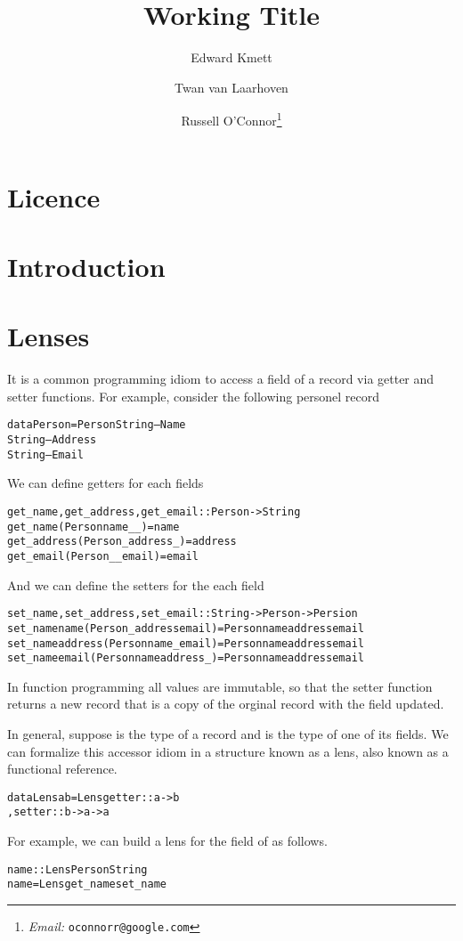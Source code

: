\documentclass{article}
\newcommand{\email}[1]{{\textit{Email:} \texttt{#1}}}
\newcommand{\tmtexttt}[1]{{\ttfamily{#1}}}
\begin{document}
\title{Working Title}\author{Edward Kmett\and Twan van Laarhoven\and Russell
O'Connor\thanks{\email{oconnorr@google.com}}}\maketitle

\section{Licence}

\section{Introduction}

\section{Lenses}

It is a common programming idiom to access a field of a record via getter and
setter functions. For example, consider the following personel record
\begin{alltt}
data Person = Person String -- Name
                     String -- Address
                     String -- Email
\end{alltt}


We can define getters for each fields
\begin{alltt}
get_name, get_address, get_email :: Person -> String
get_name (Person name _ _) = name
get_address (Person _ address _) = address
get_email (Person _ _ email) = email
\end{alltt}


And we can define the setters for the each field
\begin{alltt}
set_name, set_address, set_email :: String -> Person -> Persion
set_name name (Person _ address email) = Person name address email
set_name address (Person name _ email) = Person name address email
set_name email (Person name address _) = Person name address email
\end{alltt}


In function programming all values are immutable, so that the setter function
returns a new record that is a copy of the orginal record with the field
updated.

In general, suppose \tmtexttt{a} is the type of a record and \tmtexttt{b} is
the type of one of its fields. We can formalize this accessor idiom in a
structure known as a lens, also known as a functional reference.
\begin{alltt}
data Lens a b = Lens { getter :: a -> b
                     , setter :: b -> a -> a
                     }
\end{alltt}
For example, we can build a lens for the \tmtexttt{name} field of
\tmtexttt{Person} as follows.
\begin{alltt}
name :: Lens Person String
name = Lens get_name set_name
\end{alltt}
\end{document}
